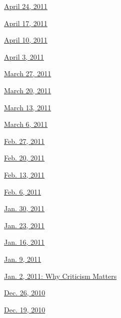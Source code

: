 \href{http://www.nytimes3xbfgragh.onion/indexes/2011/04/23/books/review/index.html}{April
24, 2011}

\href{http://www.nytimes3xbfgragh.onion/indexes/2011/04/16/books/review/index.html}{April
17, 2011}

\href{http://www.nytimes3xbfgragh.onion/indexes/2011/04/09/books/review/index.html}{April
10, 2011}

\href{http://www.nytimes3xbfgragh.onion/indexes/2011/04/02/books/review/index.html}{April
3, 2011}

\href{http://www.nytimes3xbfgragh.onion/indexes/2011/03/26/books/review/index.html}{March
27, 2011}

\href{http://www.nytimes3xbfgragh.onion/indexes/2011/03/19/books/review/index.html}{March
20, 2011}

\href{http://www.nytimes3xbfgragh.onion/indexes/2011/03/12/books/review/index.html}{March
13, 2011}

\href{http://www.nytimes3xbfgragh.onion/indexes/2011/03/05/books/review/index.html}{March
6, 2011}

\href{http://www.nytimes3xbfgragh.onion/indexes/2011/02/26/books/review/index.html}{Feb.
27, 2011}

\href{http://www.nytimes3xbfgragh.onion/indexes/2011/02/19/books/review/index.html}{Feb.
20, 2011}

\href{http://www.nytimes3xbfgragh.onion/indexes/2011/02/12/books/review/index.html}{Feb.
13, 2011}

\href{http://www.nytimes3xbfgragh.onion/indexes/2011/02/05/books/review/index.html}{Feb.
6, 2011}

\href{http://www.nytimes3xbfgragh.onion/indexes/2011/01/29/books/review/index.html}{Jan.
30, 2011}

\href{http://www.nytimes3xbfgragh.onion/indexes/2011/01/22/books/review/index.html}{Jan.
23, 2011}

\href{http://www.nytimes3xbfgragh.onion/indexes/2011/01/15/books/review/index.html}{Jan.
16, 2011}

\href{http://www.nytimes3xbfgragh.onion/indexes/2011/01/08/books/review/index.html}{Jan.
9, 2011}

\href{http://www.nytimes3xbfgragh.onion/indexes/2011/01/01/books/review/index.html}{Jan.
2, 2011: Why Criticism Matters}

\href{http://www.nytimes3xbfgragh.onion/indexes/2010/12/25/books/review/index.html}{Dec.
26, 2010}

\href{http://www.nytimes3xbfgragh.onion/indexes/2010/12/18/books/review/index.html}{Dec.
19, 2010}

